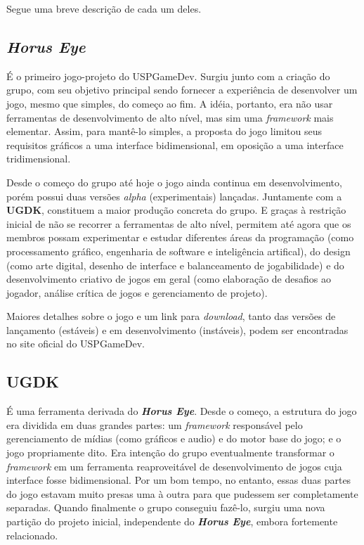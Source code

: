 \documentclass[12pt,onecolumn,a4paper]{article}
\begin{document}
    Segue uma breve descrição de cada um deles.
    
    \subsection{\textit{Horus Eye}}
    \label{sec:horus}
        É o primeiro jogo-projeto do USPGameDev. Surgiu junto com a criação do grupo, com seu
        objetivo principal sendo fornecer a experiência de desenvolver um jogo, mesmo que simples,
        do começo ao fim. A idéia, portanto, era não usar ferramentas de desenvolvimento de alto
        nível, mas sim uma \textit{framework} mais elementar. Assim, para mantê-lo simples, a
        proposta do jogo limitou seus requisitos gráficos a uma interface bidimensional, em oposição
        a uma interface tridimensional.
        
        Desde o começo do grupo até hoje o jogo ainda continua em desenvolvimento, porém possui duas
        versões \textit{alpha} (experimentais) lançadas. Juntamente com a \textbf{UGDK}, constituem
        a maior produção concreta do grupo. E graças à restrição inicial de não se recorrer a
        ferramentas de alto nível, permitem até agora que os membros possam experimentar e estudar
        diferentes áreas da programação (como processamento gráfico, engenharia de software e
        inteligência artifical), do design (como arte digital, desenho de interface e balanceamento
        de jogabilidade) e do desenvolvimento criativo de jogos em geral (como elaboração de
        desafios ao jogador, análise crítica de jogos e gerenciamento de projeto).
        
        Maiores detalhes sobre o jogo e um link para \textit{download}, tanto das versões de
        lançamento (estáveis) e em desenvolvimento (instáveis), podem ser encontradas no site
        oficial do USPGameDev.
    
    \subsection{UGDK}
        É uma ferramenta derivada do \textit{\textbf{Horus Eye}}. Desde o começo, a estrutura do
        jogo era dividida em duas grandes partes: um \textit{framework} responsável pelo
        gerenciamento de mídias (como gráficos e audio) e do motor base do jogo; e o jogo
        propriamente dito. Era intenção do grupo eventualmente transformar o \textit{framework} em
        um ferramenta reaproveitável de desenvolvimento de jogos cuja interface fosse bidimensional.
        Por um bom tempo, no entanto, essas duas partes do jogo estavam muito presas uma à outra
        para que pudessem ser completamente separadas. Quando finalmente o grupo conseguiu fazê-lo,
        surgiu uma nova partição do projeto inicial, independente do \textit{\textbf{Horus Eye}},
        embora fortemente relacionado.
        
\end{document}

